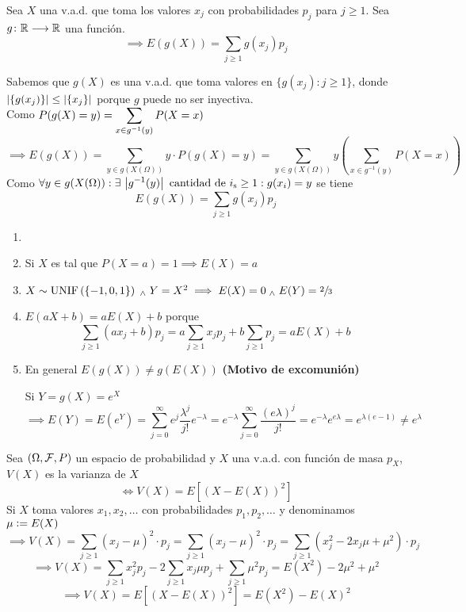 \begin{teo} \label{teo:esperanzaporg}
	Sea $X$ una v.a.d. que toma los valores $x_j$ con probabilidades $p_j$ para $j \geq 1$. Sea $g \colon \mathbb{R} \longrightarrow \mathbb{R}$ una función.
	\[\implies E(g(X))=\sum_{j\geq 1}g(x_j)p_j\]
	\begin{dem}
		Sabemos que $g(X)$ es una v.a.d. que toma valores en $\{g(x_j) : j\geq 1\}$, donde $\left|\{g(x_j)\}\right|\leq\left|\{x_j\}\right|$ porque $g$ puede no ser inyectiva. \\
		Como $\displaystyle P(g(X)=y) = \sum_{x\in g^{-1}(y)} P(X=x)$
		\[\implies E(g(X))=\sum_{y\in g(X(\Omega))}y\cdot P(g(X)=y)=\sum_{y\in g(X(\Omega))}y \left(\sum_{x\in g^{-1}(y)} P(X=x)\right)\]
		Como $\displaystyle \forall y \in g(X(\Omega)) : \exists \, \left|g^{-1}(y)\right| \text{ cantidad de } i_{\text{s}} \geq 1 : g(x_i)=y$ se tiene
		\[E(g(X))=\sum_{j\geq 1}g(x_j)p_j\]
	\end{dem}
\end{teo}

\begin{obs}
	\begin{enumerate}
		\item[]
		\item Si $X$ es tal que $P(X=a)=1\implies E(X)=a$
		\item $X \sim \operatorname{UNIF}\left(\{-1, 0, 1\}\right) \; _{\wedge} \; Y=X^2 \implies E(X)=0 \; _{\wedge} \; E(Y)=\sfrac{2}{3}$
		\item $E(aX+b)=aE(X)+b$ porque
		      \[\sum_{j\geq 1}(ax_j+b)p_j=a\sum_{j\geq 1}x_jp_j+b\sum_{j\geq 1}p_j=aE(X)+b\]
		\item En general $E(g(X)) \ne g(E(X))$ \hfill \textbf{(Motivo de excomunión)}
		      \begin{ejem}[$X\sim\poisson{\lambda} \implies E(X)=\lambda$]
			      Si $Y=g(X)=e^X$
			      \[\implies E(Y)=E(e^Y)=\sum_{j=0}^\infty e^j\frac{\lambda^j}{j!}e^{-\lambda}=e^{-\lambda}\sum_{j=0}^\infty \frac{(e\lambda)^{j}}{j!}=e^{-\lambda}e^{e\lambda}=e^{\lambda(e-1)}\ne e^\lambda\]
		      \end{ejem}
	\end{enumerate}
\end{obs}

\begin{defn}[Varianza]
	Sea $(\Omega, \mathcal{F}, P)$ un espacio de probabilidad y $X$ una v.a.d. con función de masa $p_X$, $V(X)$ es la varianza de $X$
	\[\iff V(X)=E\left[(X-E(X))^2\right]\]
	Si $X$ toma valores $x_1, x_2, \dots$ con probabilidades $p_1, p_2, \dots$ y denominamos $\mu \vcentcolon= E(X)$
	\[\implies V(X)=\sum_{j\geq 1}(x_j-\mu)^2\cdot p_j = \sum_{j\geq 1}(x_j-\mu)^2\cdot p_j = \sum_{j\geq 1}(x_j^2-2x_j\mu+\mu^2)\cdot p_j\]
	\[\implies V(X)=\sum_{j\geq 1}x_j^2p_j -2\sum_{j\geq 1}x_j\mu p_j +\sum_{j\geq 1}\mu^2p_j = E(X^2)-2\mu^2+\mu^2\]
	\[\implies \boxed{V(X) = E\left[\left(X-E(X)\right)^2\right] = E\left(X^2\right)-{E(X)}^2}\]
\end{defn}

